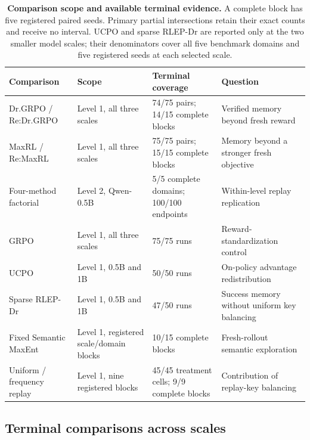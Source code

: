 \documentclass{article}
\newcommand{\1}{\mathbf 1}
\theoremstyle{remark}
\theoremstyle{definition}
\theoremstyle{plain}
\begin{document}
\begin{table}[H]
  \centering
  \caption{\textbf{Comparison scope and available terminal evidence.}
  A complete block has five registered paired seeds. Primary partial
  intersections retain their exact counts and receive no interval.
  UCPO and sparse RLEP-Dr are reported only at the two smaller model scales;
  their denominators cover all five benchmark domains and five registered
  seeds at each selected scale.}
  \label{tab:experiment-map}
  \label{tab:direct-comparators}
  \scriptsize
  \setlength{\tabcolsep}{3pt}
  \begin{tabularx}{\linewidth}{@{}P{.24\linewidth}P{.20\linewidth}P{.22\linewidth}Y@{}}
    \toprule
    \textbf{Comparison} & \textbf{Scope} & \textbf{Terminal coverage}
      & \textbf{Question} \\
    \midrule
    Dr.GRPO / Re:Dr.GRPO & Level 1, all three scales &
      74/75 pairs; 14/15 complete blocks & Verified memory beyond fresh reward \\
    MaxRL / Re:MaxRL & Level 1, all three scales &
      75/75 pairs; 15/15 complete blocks & Memory beyond a stronger fresh objective \\
    Four-method factorial & Level 2, Qwen-0.5B &
      5/5 complete domains; 100/100 endpoints & Within-level replay replication \\
    GRPO & Level 1, all three scales &
      75/75 runs & Reward-standardization control \\
    UCPO & Level 1, 0.5B and 1B &
      50/50 runs & On-policy advantage redistribution \\
    Sparse RLEP-Dr & Level 1, 0.5B and 1B &
      47/50 runs & Success memory without uniform key balancing \\
    Fixed Semantic MaxEnt & Level 1, registered scale/domain blocks &
      10/15 complete blocks & Fresh-rollout semantic exploration \\
    Uniform / frequency replay & Level 1, nine registered blocks &
      45/45 treatment cells; 9/9 complete blocks & Contribution of replay-key balancing \\
    \bottomrule
  \end{tabularx}
\end{table}





\subsection{Terminal comparisons across scales}
\label{app:scale-matrix}
\label{app:scale-snapshot}
\label{app:maxrl-scale-extensions}
\label{app:current-campaign-results}
\end{document}
